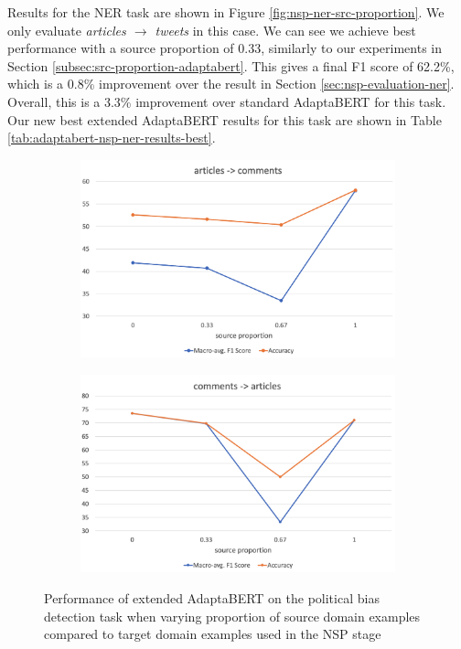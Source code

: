 Results for the NER task are shown in Figure \ref{fig:nsp-ner-src-proportion}. We only evaluate \textit{articles $ \rightarrow $ tweets} in this case. We can see we achieve best performance with a source proportion of 0.33, similarly to our experiments in Section \ref{subsec:src-proportion-adaptabert}. This gives a final F1 score of 62.2\%, which is a 0.8\% improvement over the result in Section \ref{sec:nsp-evaluation-ner}. Overall, this is a 3.3\% improvement over standard AdaptaBERT for this task. Our new best extended AdaptaBERT results for this task are shown in Table \ref{tab:adaptabert-nsp-ner-results-best}.

\begin{figure}[ht]
    \centering
    \begin{subfigure}{\textwidth}
        \centering
        \includegraphics[scale=0.24]{0-img/nsp-src-proportion-articles-comments.png}
    \end{subfigure}
    \begin{subfigure}{\textwidth}
        \centering
        \includegraphics[scale=0.24]{0-img/nsp-src-proportion-comments-articles.png}
    \end{subfigure}
    \caption{Performance of extended AdaptaBERT on the political bias detection task when varying proportion of source domain examples compared to target domain examples used in the NSP stage}
    \label{fig:nsp-src-proportion}
\end{figure}

